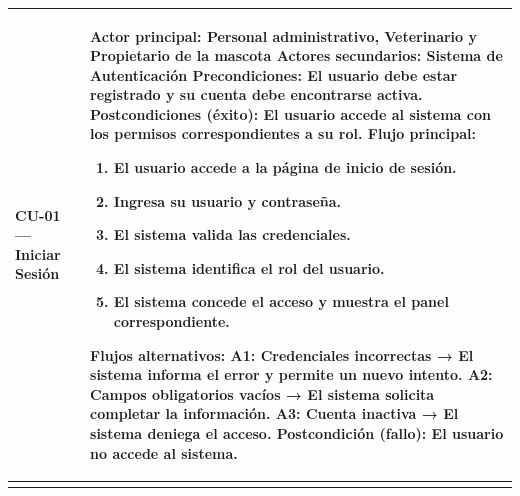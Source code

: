 \documentclass[
]{article}
\newcounter{none} %
\begin{document}
{\def\LTcaptype{none} %
\begin{longtable}[]{|
  >{\raggedright\arraybackslash}p{}|
  >{\raggedright\arraybackslash}p{}|}
\hline
\begin{minipage}[b]{\linewidth}\raggedright
\textbf{CU-01 --- Iniciar Sesión}
\end{minipage} & \begin{minipage}[b]{\linewidth}\raggedright
\textbf{Actor principal:} Personal administrativo, Veterinario y
Propietario de la mascota \textbf{Actores secundarios:} Sistema de
Autenticación
\textbf{Precondiciones:} El usuario debe estar registrado y su cuenta
debe encontrarse activa. \textbf{Postcondiciones (éxito):} El usuario accede al sistema con los
permisos correspondientes a su rol. \textbf{Flujo principal:}

\begin{enumerate}
\def\labelenumi{\arabic{enumi}.}
\item
  El usuario accede a la página de inicio de sesión.
\item
  Ingresa su usuario y contraseña.
\item
  El sistema valida las credenciales.
\item
  El sistema identifica el rol del usuario.
\item
  El sistema concede el acceso y muestra el panel correspondiente.
\end{enumerate}

\textbf{Flujos alternativos:} A1: Credenciales incorrectas → El sistema informa el error y permite un
nuevo intento. A2: Campos obligatorios vacíos → El sistema solicita
completar la información. A3: Cuenta inactiva → El sistema deniega el
acceso. \textbf{Postcondición (fallo):} El usuario no accede al sistema.
\end{minipage} \\
\hline
\endhead
\hline
\endlastfoot
\end{longtable}
}
\end{document}
